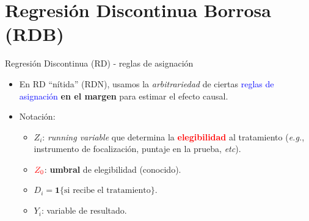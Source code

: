 \documentclass[10pt, xcolor=dvipsnames]{beamer}
\begin{document}
\section{Regresión Discontinua Borrosa (RDB)}

\begin{frame}{Regresión Discontinua (RD) - reglas de asignación}
\begin{itemize}\setlength{\itemsep}{1.0em}
	\item En RD ``nítida'' (RDN), usamos la \textit{arbitrariedad} de ciertas \textcolor{blue}{reglas de asignación} \textbf{en el margen} para estimar el efecto causal. \vspace{0.1cm}
	\pause
	\item Notación: \vspace{0.1cm}
	\begin{itemize}\setlength{\itemsep}{0.7em}
		\item $Z_i$: \textit{running variable} que determina la \textcolor{red}{\textbf{elegibilidad}} al tratamiento (\textit{e.g.}, instrumento de focalización, puntaje en la prueba, \textit{etc}). 
		\item $\textcolor{red}{Z_0}$: \textbf{umbral} de elegibilidad (conocido). 
		\item $D_i = \mathbf{1}\{\text{si recibe el tratamiento}\}$. 
		\item $Y_i$: variable de resultado.
	\end{itemize}
\end{itemize}
\end{frame}
\end{document}
